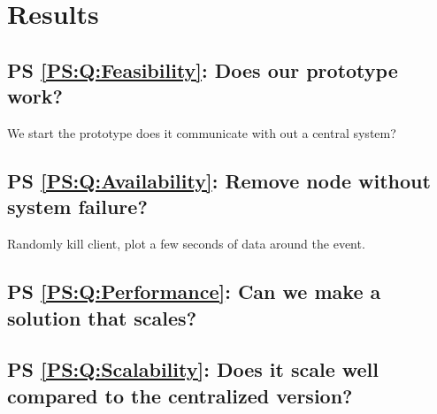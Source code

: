 
\chapter{Results}

\section{PS \ref{PS:Q:Feasibility}: Does our prototype work?}
We start the prototype does it communicate with out a central system?


\section{PS \ref{PS:Q:Availability}: Remove node without system failure?}
Randomly kill client, plot a few seconds of data around the event.

\section{PS \ref{PS:Q:Performance}: Can we make a solution that scales?}




\section{PS \ref{PS:Q:Scalability}: Does it scale well compared to the centralized version?}




